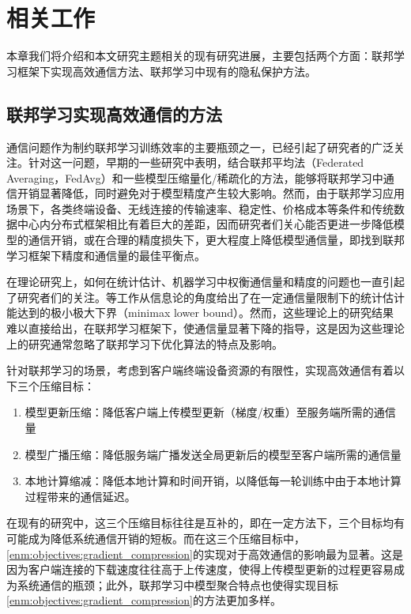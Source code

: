 \chapter{相关工作}

本章我们将介绍和本文研究主题相关的现有研究进展，主要包括两个方面：联邦学习框架下实现高效通信方法、联邦学习中现有的隐私保护方法。

\section{联邦学习实现高效通信的方法}


通信问题作为制约联邦学习训练效率的主要瓶颈之一，已经引起了研究者的广泛关注。针对这一问题，早期的一些研究\cite{konevcny2016federated}中表明，结合联邦平均法（Federated Averaging，FedAvg）\cite{mcmahan2017communication}和一些模型压缩量化/稀疏化的方法，能够将联邦学习中通信开销显著降低，同时避免对于模型精度产生较大影响。然而，由于联邦学习应用场景下，各类终端设备、无线连接的传输速率、稳定性、价格成本等条件和传统数据中心内分布式框架相比有着巨大的差距，因而研究者们关心能否更进一步降低模型的通信开销，或在合理的精度损失下，更大程度上降低模型通信量，即找到联邦学习框架下精度和通信量的最佳平衡点。

在理论研究上，如何在统计估计、机器学习中权衡通信量和精度的问题也一直引起了研究者们的关注。\parencite{zhang2013information, braverman2016communication, han2018geometric, barnes2020lower}等工作从信息论的角度给出了在一定通信量限制下的统计估计能达到的极小极大下界（minimax lower bound）。然而，这些理论上的研究结果难以直接给出，在联邦学习框架下，使通信量显著下降的指导，这是因为这些理论上的研究通常忽略了联邦学习下优化算法的特点及影响。

针对联邦学习的场景，考虑到客户端终端设备资源的有限性，实现高效通信有着以下三个压缩目标：
\begin{enumerate}[label=(\alph*)]
    \item \label{enm:objectives:gradient_compression} 模型更新压缩：降低客户端上传模型更新（梯度/权重）至服务端所需的通信量
    \item 模型广播压缩：降低服务端广播发送全局更新后的模型至客户端所需的通信量
    \item 本地计算缩减：降低本地计算和时间开销，以降低每一轮训练中由于本地计算过程带来的通信延迟。
\end{enumerate}

在现有的研究中，这三个压缩目标往往是互补的，即在一定方法下，三个目标均有可能成为降低系统通信开销的短板。而在这三个压缩目标中，\ref{enm:objectives:gradient_compression}的实现对于高效通信的影响最为显著。这是因为客户端连接的下载速度往往高于上传速度，使得上传模型更新的过程更容易成为系统通信的瓶颈；此外，联邦学习中模型聚合特点也使得实现目标\ref{enm:objectives:gradient_compression}的方法更加多样。

